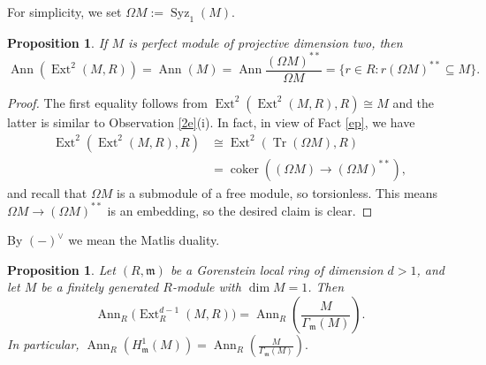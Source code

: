 \documentclass[11pt,a4paper]{amsart}
\numberwithin{equation}{section}
\newtheorem{proposition}[theorem]{Proposition}
\DeclareMathOperator{\coker}{coker}
\DeclareMathOperator{\Ann}{Ann}\DeclareMathOperator{\ann}{Ann}
\DeclareMathOperator{\Tr}{Tr}\DeclareMathOperator{\tr}{tr}
\DeclareMathOperator{\Ext}{Ext}
\DeclareMathOperator{\Syz}{Syz}
\begin{document}
For simplicity, we set $\Omega M:=\Syz_{1}(M)$.

\begin{proposition} 
	If $M$ is perfect module of projective dimension two, then
	\[
	\Ann(\Ext^2(M,R)) = \Ann(M)=\Ann \frac{(\Omega M)^{**}}{\Omega M} = \{r \in R:r(\Omega M)^{**}\subseteq M\}.
	\]
\end{proposition}

\begin{proof}
	The first equality follows from
	\(\Ext^2(\Ext^2(M,R),R) \cong M
	\) and the latter is similar to Observation \ref{2e}(i). In fact, in view of Fact \ref{ep}, we have
	\[
	\begin{array}{ll}
	\Ext^2(\Ext^2(M,R),R) &\cong \Ext^2(\Tr(\Omega M),R) \\
	&= \coker((\Omega M)\to (\Omega M)^{**}),
	\end{array}
	\]	
	and recall that $\Omega M$ is a submodule of a free module, so torsionless. This means   $\Omega M \to (\Omega M)^{**} $ is an embedding, so the desired  claim is clear.	
\end{proof}
By $(-)^{\vee}$ we mean the  Matlis duality.
\begin{proposition}\label{1d}
	Let $(R,\mathfrak m)$ be a Gorenstein local ring of dimension $d>1$, and let $M$ be a finitely generated $R$-module with $\dim M = 1$. Then
	\[
	\Ann_R\!\big(\Ext^{d-1}_R(M,R)\big)
	= \Ann_R\!(\frac{M}{\Gamma_{\mathfrak m}(M)}).
	\]
	In particular,
	\(
	\Ann_R\!(H^{1}_{\mathfrak m}(M))
	= \Ann_R\!(\frac{M}{\Gamma_{\mathfrak m}(M)}).
	\)
\end{proposition}
\end{document}
